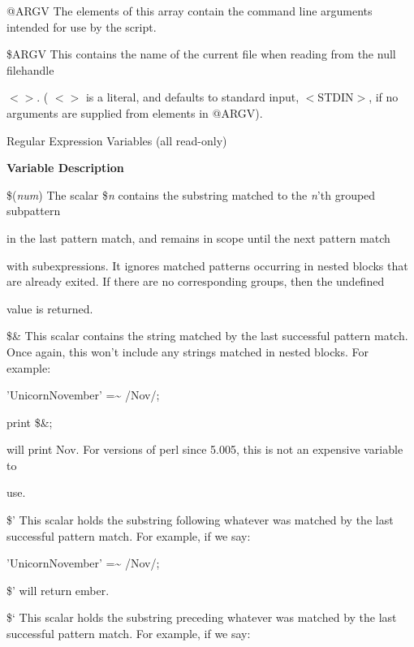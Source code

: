 \documentclass[a4paper,11pt]{book}
\begin{document}
\noindent 

\noindent @ARGV The elements of this array contain the command line arguments intended for use by the script.

\noindent 

\noindent \$ARGV This contains the name of the current file when reading from the null filehandle

\noindent $<$$>$. ( $<$$>$ is a literal, and defaults to standard input, $<$STDIN$>$, if no arguments are supplied from elements in @ARGV).

\noindent \eject 

\noindent Regular Expression Variables (all read-only)

\noindent 

\noindent \textbf{Variable Description}

\noindent 

\noindent \$(\textit{num}) The scalar  \$\textit{n }contains the substring  matched  to  the  \textit{n}'th  grouped  subpattern

\noindent in  the  last pattern match,  and  remains  in  scope  until  the  next  pattern  match

\noindent with subexpressions.  It  ignores  matched  patterns  occurring  in  nested  blocks  that are already exited.  If there are  no  corresponding  groups,  then  the  undefined

\noindent value  is returned.

\noindent 

\noindent \$\& This  scalar contains the string matched by the last successful pattern match. Once again, this won't include any strings matched in nested blocks. For example:

\noindent 'UnicornNovember' =\~{} /Nov/;

\noindent print \$\&;

\noindent will print Nov. For versions of perl since 5.005, this is not an expensive variable to

\noindent use.

\noindent 

\noindent \$' This scalar holds the substring following whatever was matched by the last successful pattern match. For example, if we say:

\noindent 'UnicornNovember' =\~{} /Nov/;

\noindent \$' will return ember.

\noindent 

\noindent \$` This scalar holds the substring preceding whatever was matched by the last successful pattern match. For example, if we say:
\end{document}
